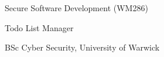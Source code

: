 
\Huge

\noindent Secure Software Development (WM286)


\Large

\vspace{1cm}


\noindent Todo List Manager

\normalsize


\vspace{3cm}


\vspace{1cm}

\noindent BSc Cyber Security, University of Warwick

\clearpage



